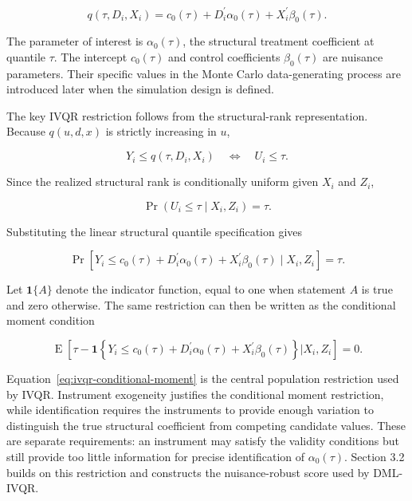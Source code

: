 \begin{equation}
    q(\tau,D_i,X_i)
    = c_0(\tau)
      + D_i^{\prime}\alpha_0(\tau)
      + X_i^{\prime}\beta_0(\tau).
    \label{eq:linear-structural-quantile}
\end{equation}

The parameter of interest is \(\alpha_0(\tau)\), the structural treatment coefficient at quantile \(\tau\). The intercept \(c_0(\tau)\) and control coefficients \(\beta_0(\tau)\) are nuisance parameters. Their specific values in the Monte Carlo data-generating process are introduced later when the simulation design is defined.

The key IVQR restriction follows from the structural-rank representation. Because \(q(u,d,x)\) is strictly increasing in \(u\),

\[
    Y_i\leq q(\tau,D_i,X_i)
    \quad\Longleftrightarrow\quad
    U_i\leq\tau.
\]

Since the realized structural rank is conditionally uniform given \(X_i\) and \(Z_i\),

\[
    \Pr(U_i\leq\tau\mid X_i,Z_i)=\tau.
\]

Substituting the linear structural quantile specification gives

\begin{equation}
    \Pr\!\left[
        Y_i \leq c_0(\tau)
        + D_i^{\prime}\alpha_0(\tau)
        + X_i^{\prime}\beta_0(\tau)
        \mid X_i,Z_i
    \right]
    = \tau.
    \label{eq:ivqr-conditional-restriction}
\end{equation}

Let \(\mathbf{1}\{A\}\) denote the indicator function, equal to one when statement \(A\) is true and zero otherwise. The same restriction can then be written as the conditional moment condition

\begin{equation}
    \operatorname{E}\!\left[
        \tau
        - \mathbf{1}\!\left\{
            Y_i \leq c_0(\tau)
            + D_i^{\prime}\alpha_0(\tau)
            + X_i^{\prime}\beta_0(\tau)
        \right\}
        \mathrel{\big|} X_i,Z_i
    \right]
    = 0.
    \label{eq:ivqr-conditional-moment}
\end{equation}

Equation~\eqref{eq:ivqr-conditional-moment} is the central population restriction used by IVQR. Instrument exogeneity justifies the conditional moment restriction, while identification requires the instruments to provide enough variation to distinguish the true structural coefficient from competing candidate values. These are separate requirements: an instrument may satisfy the validity conditions but still provide too little information for precise identification of \(\alpha_0(\tau)\). Section 3.2 builds on this restriction and constructs the nuisance-robust score used by DML-IVQR.

